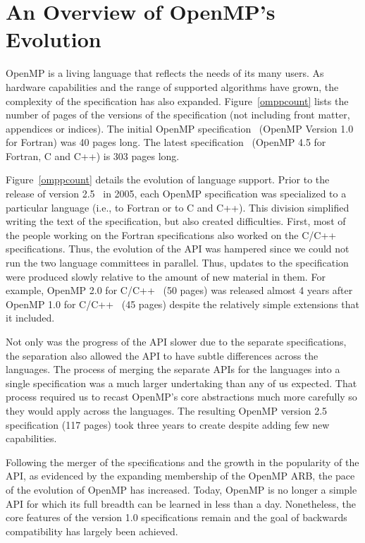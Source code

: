 \section{An Overview of OpenMP's Evolution}
\label{sec:evolve}

OpenMP is a living language that reflects the needs of its many users. 
As hardware capabilities and the range of supported algorithms have 
grown, the complexity of the specification has also expanded. 
Figure~\ref{omppcount} lists the number of pages of the versions of 
the specification (not including front matter, appendices or indices).   
The initial OpenMP specification~\cite{openmp1f} (OpenMP Version 1.0 for
Fortran) was 40 pages long. The latest specification~\cite{openmp45} (OpenMP 4.5
for Fortran, C and C++) is 303 pages long.

Figure~\ref{omppcount} details the evolution of language support.
Prior to the release of version 2.5~\cite{openmp25} in 2005, each OpenMP specification 
was specialized to a particular language (i.e., to Fortran or to C and 
C++). This division simplified writing the text of the specification, 
but also created difficulties. First, most of the people working on the 
Fortran specifications also worked on the C/C++ specifications. Thus, the 
evolution of the API was hampered since we could not run the two 
language committees in parallel. Thus, updates to the specification 
were produced slowly relative to the amount of new material in them. For
example, OpenMP 2.0 for C/C++~\cite{openmp2c} (50 pages) was released almost 4
years after OpenMP 1.0 for C/C++~\cite{openmp1c} (45 pages) despite the
relatively simple extensions that it included. 

Not only was the progress of the API slower due to the separate 
specifications, the separation also allowed the API to have subtle 
differences across the languages. The process of merging the separate
APIs for the languages into a single  specification was a much larger 
undertaking than any of us expected. That process required us to recast 
OpenMP's core abstractions much more carefully so they would apply across 
the languages. The resulting OpenMP version 2.5 specification (117 pages)
took three years to create despite adding few new capabilities.

Following the merger of the specifications and the growth in the popularity
of the API, as evidenced by the expanding membership of the OpenMP ARB,
the pace of the evolution of OpenMP has increased. Today, OpenMP is no 
longer a simple API for which its full breadth can be learned in less 
than a day. Nonetheless, the core features of the version 1.0 specifications
remain and the goal of backwards compatibility has largely been achieved.

